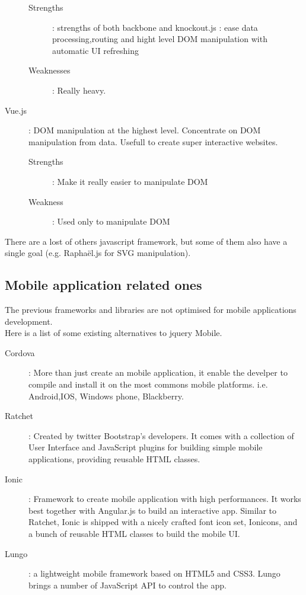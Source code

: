 \documentclass[12pt]{report}%
\begin{document}
\begin{description}
\begin{description}
		\item[Strengths] : strengths of both backbone and knockout.js : ease data processing,routing and hight level DOM manipulation with automatic UI refreshing
		\item[Weaknesses] : Really heavy.
	\end{description}
	\item[Vue.js] : DOM manipulation at the highest level. Concentrate on DOM manipulation from data. Usefull to create super interactive websites. \begin{description}
		\item[Strengths] : Make it really easier to manipulate DOM
		\item[Weakness] : Used only to manipulate DOM
	\end{description}
\end{description}

There are a lost of others javascript framework, but some of them also have a single goal (e.g. Raphaël.js for SVG manipulation).


\subsection{Mobile application related ones}
The previous frameworks and libraries are not optimised for mobile applications development.\\
Here is a list of some existing alternatives to jquery Mobile.

\begin{description}
	\item[Cordova] : More than just create an mobile application, it enable the develper to compile and install it on the most commons mobile platforms. i.e. Android,IOS, Windows phone, Blackberry.
	\item[Ratchet] : Created by twitter Bootstrap's developers. It comes with a collection of User Interface and JavaScript plugins for building simple mobile applications, providing reusable HTML classes.
	\item[Ionic] : Framework to create mobile application with high performances. It works best together with Angular.js to build an interactive app. Similar to Ratchet, Ionic is shipped with a nicely crafted font icon set, Ionicons, and a bunch of reusable HTML classes to build the mobile UI.
	\item[Lungo] : a lightweight mobile framework based on HTML5 and CSS3. Lungo brings a number of JavaScript API to control the app.
\end{description}
\end{document}
